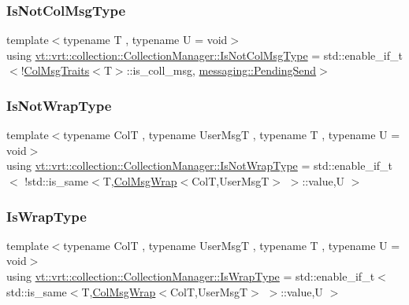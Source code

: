 \subsubsection{\texorpdfstring{Is\+Not\+Col\+Msg\+Type}{IsNotColMsgType}}
{\footnotesize\ttfamily template$<$typename T , typename U  = void$>$ \\
using \hyperlink{structvt_1_1vrt_1_1collection_1_1_collection_manager_ae376deeefd4f89a0b1c93849977715d9}{vt\+::vrt\+::collection\+::\+Collection\+Manager\+::\+Is\+Not\+Col\+Msg\+Type} =  std\+::enable\+\_\+if\+\_\+t$<$!\hyperlink{structvt_1_1vrt_1_1collection_1_1_col_msg_traits}{Col\+Msg\+Traits}$<$T$>$\+::is\+\_\+coll\+\_\+msg, \hyperlink{structvt_1_1messaging_1_1_pending_send}{messaging\+::\+Pending\+Send}$>$}

\mbox{\label{structvt_1_1vrt_1_1collection_1_1_collection_manager_a18e3a17d9eb086c6c2f499242b7faa1e}} 
\subsubsection{\texorpdfstring{Is\+Not\+Wrap\+Type}{IsNotWrapType}}
{\footnotesize\ttfamily template$<$typename ColT , typename User\+MsgT , typename T , typename U  = void$>$ \\
using \hyperlink{structvt_1_1vrt_1_1collection_1_1_collection_manager_a18e3a17d9eb086c6c2f499242b7faa1e}{vt\+::vrt\+::collection\+::\+Collection\+Manager\+::\+Is\+Not\+Wrap\+Type} =  std\+::enable\+\_\+if\+\_\+t$<$ !std\+::is\+\_\+same$<$T,\hyperlink{structvt_1_1vrt_1_1collection_1_1_col_msg_wrap}{Col\+Msg\+Wrap}$<$ColT,User\+MsgT$>$ $>$\+::value,U $>$}

\mbox{\label{structvt_1_1vrt_1_1collection_1_1_collection_manager_a1f91c97ed52237c3a3576dfbbe87c8f8}} 
\subsubsection{\texorpdfstring{Is\+Wrap\+Type}{IsWrapType}}
{\footnotesize\ttfamily template$<$typename ColT , typename User\+MsgT , typename T , typename U  = void$>$ \\
using \hyperlink{structvt_1_1vrt_1_1collection_1_1_collection_manager_a1f91c97ed52237c3a3576dfbbe87c8f8}{vt\+::vrt\+::collection\+::\+Collection\+Manager\+::\+Is\+Wrap\+Type} =  std\+::enable\+\_\+if\+\_\+t$<$ std\+::is\+\_\+same$<$T,\hyperlink{structvt_1_1vrt_1_1collection_1_1_col_msg_wrap}{Col\+Msg\+Wrap}$<$ColT,User\+MsgT$>$ $>$\+::value,U $>$}

